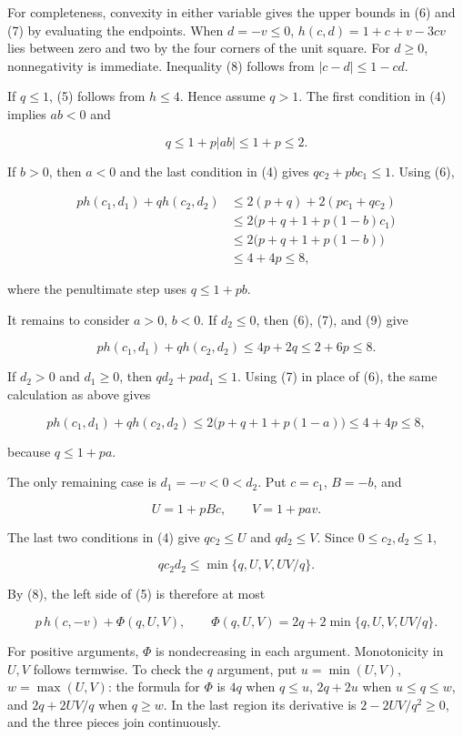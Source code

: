 \documentclass[10pt,a4paper]{article}
\begin{document}
For completeness, convexity in either variable gives the upper bounds in
(6) and (7) by evaluating the endpoints. When \(d=-v\le0\),
\(h(c,d)=1+c+v-3cv\) lies between zero and two by the four corners of
the unit square. For \(d\ge0\), nonnegativity is immediate. Inequality
(8) follows from \(|c-d|\le1-cd\).

If \(q\le1\), (5) follows from \(h\le4\). Hence assume \(q>1\). The
first condition in (4) implies \(ab<0\) and

\[
q\le1+p|ab|\le1+p\le2.
\tag{9}
\]

If \(b>0\), then \(a<0\) and the last condition in (4) gives
\(qc_2+pbc_1\le1\). Using (6),

\[
\begin{aligned}
p h(c_1,d_1)+q h(c_2,d_2)
&\le2(p+q)+2(pc_1+qc_2)\\
&\le2\bigl(p+q+1+p(1-b)c_1\bigr)\\
&\le2\bigl(p+q+1+p(1-b)\bigr)\\
&\le4+4p\le8,
\end{aligned}
\]

where the penultimate step uses \(q\le1+pb\).

It remains to consider \(a>0\), \(b<0\). If \(d_2\le0\), then (6), (7),
and (9) give

\[
p h(c_1,d_1)+q h(c_2,d_2)
\le4p+2q\le2+6p\le8.
\]

If \(d_2>0\) and \(d_1\ge0\), then \(qd_2+pa d_1\le1\). Using (7) in
place of (6), the same calculation as above gives

\[
p h(c_1,d_1)+q h(c_2,d_2)
\le2\bigl(p+q+1+p(1-a)\bigr)\le4+4p\le8,
\]

because \(q\le1+pa\).

The only remaining case is \(d_1=-v<0<d_2\). Put \(c=c_1\), \(B=-b\),
and

\[
U=1+pBc,\qquad V=1+pav.
\]

The last two conditions in (4) give \(qc_2\le U\) and \(qd_2\le V\).
Since \(0\le c_2,d_2\le1\),

\[
q c_2d_2\le\min\{q,U,V,UV/q\}.
\]

By (8), the left side of (5) is therefore at most

\[
p\,h(c,-v)+\Phi(q,U,V),\qquad
\Phi(q,U,V)=2q+2\min\{q,U,V,UV/q\}.
\]

For positive arguments, \(\Phi\) is nondecreasing in each argument.
Monotonicity in \(U,V\) follows termwise. To check the \(q\) argument,
put \(u=\min(U,V)\), \(w=\max(U,V)\): the formula for \(\Phi\) is \(4q\)
when \(q\le u\), \(2q+2u\) when \(u\le q\le w\), and \(2q+2UV/q\) when
\(q\ge w\). In the last region its derivative is \(2-2UV/q^2\ge0\), and
the three pieces join continuously.
\end{document}
